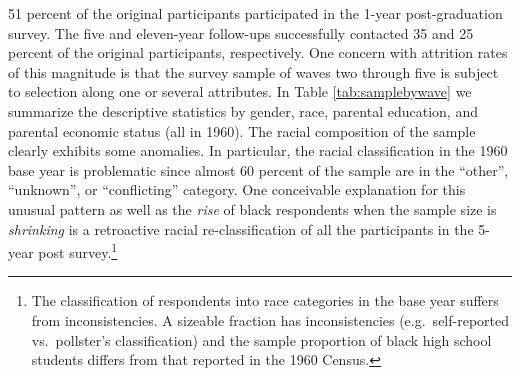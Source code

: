 \documentclass[onehalfspacing,11pt]{article}
\begin{document}
51 percent of the original participants participated in the 1-year post-graduation survey. The five and eleven-year follow-ups successfully contacted 35 and 25 percent of the original participants, respectively. One concern with attrition rates of this magnitude is that the survey sample of waves two through five is subject to selection along one or several attributes. In Table \ref{tab:samplebywave} we summarize the descriptive statistics by gender, race, parental education, and parental economic status (all in 1960). The racial composition of the sample clearly exhibits some anomalies. In particular, the racial classification in the 1960 base year is problematic since almost 60 percent of the sample are in the ``other'', ``unknown'', or ``conflicting'' category. One conceivable explanation for this unusual pattern as well as the {\it rise} of black respondents when the sample size is {\it shrinking} is a retroactive racial re-classification of all the participants in the 5-year post survey.\footnote{The classification of respondents into race categories in the base year suffers from inconsistencies. A sizeable fraction has inconsistencies (e.g.~self-reported vs.~pollster's classification) and the sample proportion of black high school students differs from that reported in the 1960 Census.}
\end{document}
